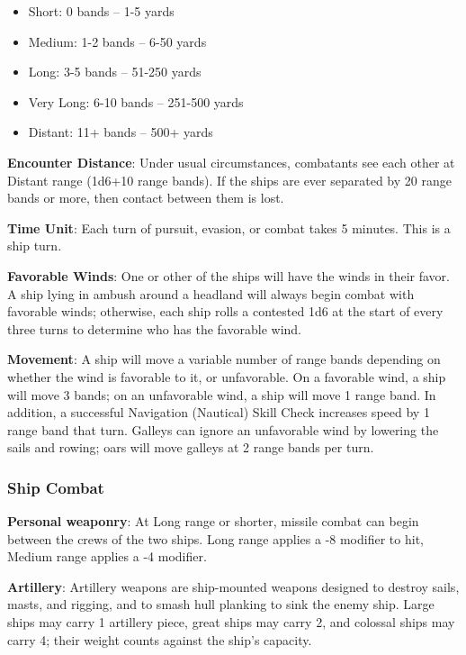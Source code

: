 \documentclass{book}
\providecommand{\tightlist}{%
\setlength{\itemsep}{0pt}\setlength{\parskip}{0pt}}
\begin{document}
\begin{itemize}
\tightlist
\item
  Short: 0 bands -- 1-5 yards
\item
  Medium: 1-2 bands -- 6-50 yards
\item
  Long: 3-5 bands -- 51-250 yards
\item
  Very Long: 6-10 bands -- 251-500 yards
\item
  Distant: 11+ bands -- 500+ yards
\end{itemize}

\textbf{Encounter Distance}: Under usual circumstances, combatants see
each other at Distant range (1d6+10 range bands). If the ships are ever
separated by 20 range bands or more, then contact between them is lost.

\textbf{Time Unit}: Each turn of pursuit, evasion, or combat takes 5
minutes. This is a ship turn.

\textbf{Favorable Winds}: One or other of the ships will have the winds
in their favor. A ship lying in ambush around a headland will always
begin combat with favorable winds; otherwise, each ship rolls a
contested 1d6 at the start of every three turns to determine who has the
favorable wind.

\textbf{Movement}: A ship will move a variable number of range bands
depending on whether the wind is favorable to it, or unfavorable. On a
favorable wind, a ship will move 3 bands; on an unfavorable wind, a ship
will move 1 range band. In addition, a successful Navigation (Nautical)
Skill Check increases speed by 1 range band that turn. Galleys can
ignore an unfavorable wind by lowering the sails and rowing; oars will
move galleys at 2 range bands per turn.

\subsubsection*{Ship Combat}\label{ship-combat}

\textbf{Personal weaponry}: At Long range or shorter, missile combat can
begin between the crews of the two ships. Long range applies a -8
modifier to hit, Medium range applies a -4 modifier.

\textbf{Artillery}: Artillery weapons are ship-mounted weapons designed
to destroy sails, masts, and rigging, and to smash hull planking to sink
the enemy ship. Large ships may carry 1 artillery piece, great ships may
carry 2, and colossal ships may carry 4; their weight counts against the
ship's capacity.
\end{document}
